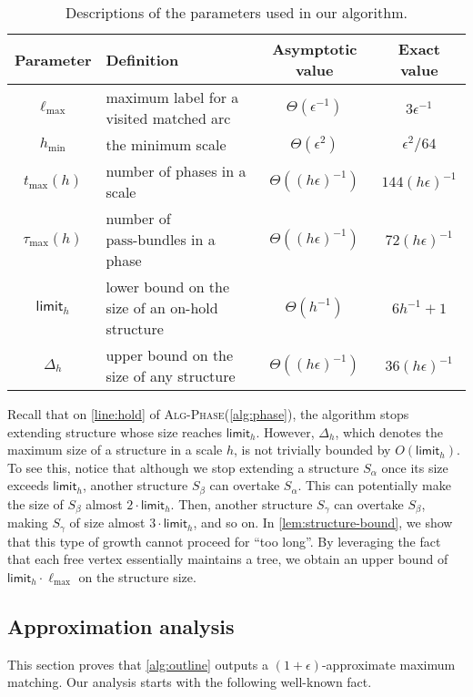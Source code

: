 \documentclass{article}
\newcommand{\alp}{\alpha}
\newcommand{\eps}{\epsilon}
\newcommand{\lmax}{\ell_{\max}}
\newcommand{\tmax}{t_{\max}}
\newcommand{\hmin}{h_{\min}}
\newcommand{\taumax}{\tau_{\max}}
\newcommand{\bundle}{\text{pass-bundle}\xspace}
\newcommand{\limit}{\mathsf{limit}}
\newcommand{\algPhase}{\textsc{Alg-Phase}\xspace}
\begin{document}
\begin{table}[h]
    \centering
    \setlength{\extrarowheight}{4pt}
    \begin{tabular}{|c|l|c|c|}
    \hline
    Parameter & Definition  & Asymptotic value & Exact value \\ \hline
    $\lmax$ & maximum label for a visited matched arc  & $\Theta(\eps^{-1})$ & $3\eps^{-1}$ \\ \hline
    $\hmin$      & the minimum scale  & $\Theta(\eps^2)$ & $\eps^2 / 64$ \\ \hline
    $\tmax(h)$   & number of phases in a scale  & $\Theta((h\eps)^{-1})$ & $144(h\eps)^{-1}$ \\ \hline
    $\taumax(h)$ & number of $\bundle$s in a phase  & $\Theta((h\eps)^{-1})$ & $72(h\eps)^{-1}$ \\ \hline
    $\limit_h$   & lower bound on the size of an on-hold structure  & $\Theta(h^{-1})$ & $6h^{-1} + 1$ \\ \hline
    $\Delta_h$   & upper bound on the size of any structure  & $\Theta((h\eps)^{-1})$ & $36(h\eps)^{-1}$ \\ \hline
    \end{tabular}
    \caption{Descriptions of the parameters used in our algorithm.} \label{tab:parameter}
\end{table}

Recall that on \cref*{line:hold} of \algPhase (\cref{alg:phase}), the algorithm stops extending structure whose size reaches $\limit_h$.
However, $\Delta_h$, which denotes the maximum size of a structure in a scale $h$, is not trivially bounded by $O(\limit_h)$.
To see this, notice that although we stop extending a structure $S_\alp$ once its size exceeds $\limit_h$, another structure $S_\beta$ can overtake $S_\alp$.
This can potentially make the size of $S_\beta$ almost $2 \cdot \limit_h$.
Then, another structure $S_\gamma$ can overtake $S_\beta$, making $S_\gamma$
of size almost $3 \cdot \limit_h$, and so on.
In \cref{lem:structure-bound}, we show that this type of growth cannot proceed for ``too long''. 
By leveraging the fact that each free vertex essentially maintains a tree, we obtain an upper bound of $\limit_h \cdot \lmax$ on the structure size.






\subsection{Approximation analysis}
This section proves that \cref{alg:outline} outputs a $(1+\eps)$-approximate maximum matching.
Our analysis starts with the following well-known fact.
 
\end{document}
